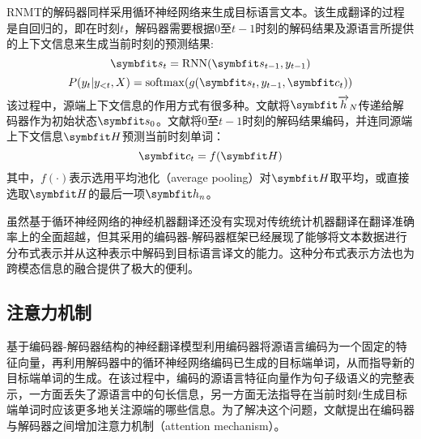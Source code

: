 RNMT的解码器同样采用循环神经网络来生成目标语言文本。该生成翻译的过程是自回归的，即在时刻$t$，解码器需要根据$0$至$t-1$时刻的解码结果及源语言所提供的上下文信息来生成当前时刻的预测结果:
\begin{equation}
    \Vector{s}_t=\mathrm{RNN}(\Vector{s_{t-1}},y_{t-1})
\end{equation}
\begin{equation}
    P(y_t|y_{<t},X)=\mathrm{softmax}(g(\Vector{s_t}, y_{t-1}, \Vector{c_t}))
\end{equation}
该过程中，源端上下文信息的作用方式有很多种。文献\cite{1_DBLP:journals/corr/SutskeverVL14}将$\rarwvec{h}_N$传递给解码器作为初始状态$\Vector{s_0}$。文献\cite{2_cho-etal-2014-learning}将$0$至$t-1$时刻的解码结果编码，并连同源端上下文信息$\Vector{H}$预测当前时刻单词：
\begin{equation}
    \Vector{c_t}=f(\Vector{H})
\end{equation}
其中，$f(\cdot)$表示选用平均池化（average pooling）对$\Vector{H}$取平均，或直接选取$\Vector{H}$的最后一项$\Vector{h_n}$。

虽然基于循环神经网络的神经机器翻译还没有实现对传统统计机器翻译在翻译准确率上的全面超越，但其采用的编码器-解码器框架已经展现了能够将文本数据进行分布式表示并从这种表示中解码到目标语言译文的能力。这种分布式表示方法也为跨模态信息的融合提供了极大的便利。

\subsection{注意力机制}
\label{sec:2_attention}
基于编码器-解码器结构的神经翻译模型利用编码器将源语言编码为一个固定的特征向量，再利用解码器中的循环神经网络编码已生成的目标端单词，从而指导新的目标端单词的生成。在该过程中，编码的源语言特征向量作为句子级语义的完整表示，一方面丢失了源语言中的句长信息，另一方面无法指导在当前时刻$t$生成目标端单词时应该更多地关注源端的哪些信息。为了解决这个问题，文献\cite{3_DBLP:journals/corr/BahdanauCB14}提出在编码器与解码器之间增加注意力机制（attention mechanism）。

